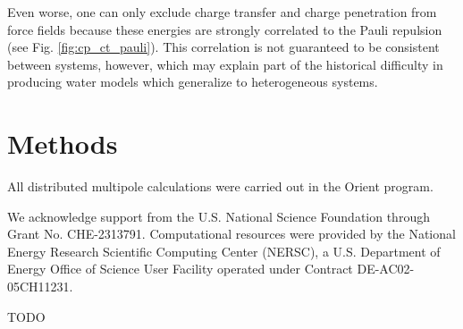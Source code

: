 \documentclass[journal=jctcce,manuscript=article]{achemso}
\begin{document}
Even worse, one can only
exclude charge transfer and charge penetration from force fields because
these energies are strongly correlated to the Pauli repulsion (see Fig. \ref{fig:cp_ct_pauli}).
This correlation is not guaranteed to be consistent between systems, however,
which may explain part of the historical difficulty in producing water models which
generalize to heterogeneous systems.

\section*{Methods}
All distributed multipole calculations were carried out
in the Orient program.\cite{stone2002orient}

\begin{acknowledgement}
We acknowledge support from the U.S. National Science Foundation through Grant No. CHE-2313791. Computational resources were provided by the National Energy Research Scientific Computing Center (NERSC), a U.S. Department of Energy Office of Science User Facility operated under Contract DE-AC02-05CH11231.
\end{acknowledgement}

\begin{suppinfo}

TODO

\end{suppinfo}


\end{document}
